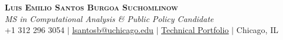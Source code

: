 \documentclass[letterpaper,11pt]{article}
\begin{document}

\begin{center}
    \textbf{\Large \scshape Luis Emilio Santos Burgoa Suchomlinow} \\ \vspace{1pt}
    \small \textit{MS in Computational Analysis \& Public Policy Candidate} \\
    +1 312 296 3054 $|$ \href{mailto:lsantosb@uchicago.edu} {{\underline{lsantosb@uchicago.edu}}} $|$ \href{https://suchomlinow.github.io/luis.santosburgoa/}{\underline{Technical Portfolio}} $|$
    Chicago, IL
\end{center}


\end{document}

